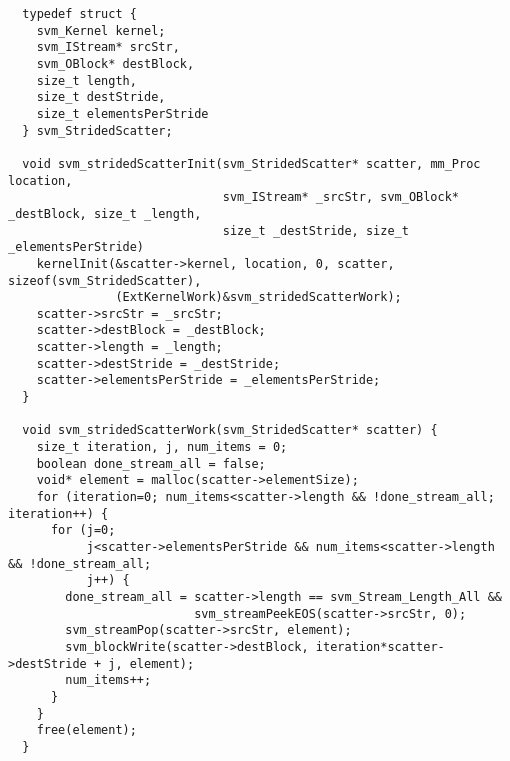 \clearpage
\makeline
{}
{\small
\begin{verbatim}
  typedef struct {
    svm_Kernel kernel;
    svm_IStream* srcStr,
    svm_OBlock* destBlock,
    size_t length,
    size_t destStride,
    size_t elementsPerStride
  } svm_StridedScatter;

  void svm_stridedScatterInit(svm_StridedScatter* scatter, mm_Proc location, 
                              svm_IStream* _srcStr, svm_OBlock* _destBlock, size_t _length,
                              size_t _destStride, size_t _elementsPerStride)
    kernelInit(&scatter->kernel, location, 0, scatter, sizeof(svm_StridedScatter), 
               (ExtKernelWork)&svm_stridedScatterWork);
    scatter->srcStr = _srcStr;
    scatter->destBlock = _destBlock;
    scatter->length = _length;
    scatter->destStride = _destStride;
    scatter->elementsPerStride = _elementsPerStride;
  }

  void svm_stridedScatterWork(svm_StridedScatter* scatter) {
    size_t iteration, j, num_items = 0;
    boolean done_stream_all = false;
    void* element = malloc(scatter->elementSize);
    for (iteration=0; num_items<scatter->length && !done_stream_all; iteration++) {
      for (j=0; 
           j<scatter->elementsPerStride && num_items<scatter->length && !done_stream_all; 
           j++) {
        done_stream_all = scatter->length == svm_Stream_Length_All && 
                          svm_streamPeekEOS(scatter->srcStr, 0);
        svm_streamPop(scatter->srcStr, element);
        svm_blockWrite(scatter->destBlock, iteration*scatter->destStride + j, element);
        num_items++;
      }
    }
    free(element);
  }
\end{verbatim}}

